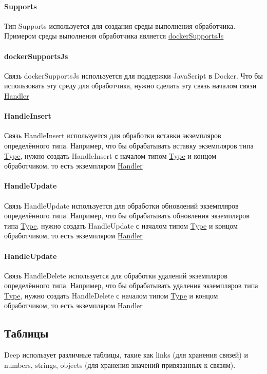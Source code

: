 \documentclass{article}
\begin{document}
\paragraph*{Supports}
Тип Supports\hypertarget{handler.Def}{} используется для создания среды
выполнения обработчика. Примером среды выполнения обработчика является
\hyperlink{dockerSupportsJs.Def}{dockerSupportsJs}
\paragraph*{dockerSupportsJs}
Связь dockerSupportsJs\hypertarget{dockerSupportsJs.Def}{} используется для
поддержки JavaScript в Docker. Что бы использовать эту среду для обработчика,
нужно сделать эту связь началом связи \hyperlink{handler.Def}{Handler}
\paragraph*{HandleInsert}
Связь HandleInsert\hypertarget{HandleInsert.Def}{} используется для обработки
вставки экземпляров определённого типа. Например, что бы обрабатывать вставку
экземпляров типа \hyperlink{type.Def}{Type}, нужно создать HandleInsert с
началом типом \hyperlink{type.Def}{Type} и концом обработчиком, то есть
экземпляром \hyperlink{handler.Def}{Handler}
\paragraph*{HandleUpdate}
Связь HandleUpdate\hypertarget{HandleUpdate.Def}{} используется для обработки
обновлений экземпляров определённого типа. Например, что бы обрабатывать
обновления экземпляров типа \hyperlink{type.Def}{Type}, нужно создать
HandleUpdate с началом типом \hyperlink{type.Def}{Type} и концом обработчиком,
то есть экземпляром \hyperlink{handler.Def}{Handler}
\paragraph*{HandleUpdate}
Связь HandleDelete\hypertarget{HandleDelete.Def}{} используется для обработки
удалений экземпляров определённого типа. Например, что бы обрабатывать удаления
экземпляров типа \hyperlink{type.Def}{Type}, нужно создать HandleDelete с
началом типом \hyperlink{type.Def}{Type} и концом обработчиком, то есть
экземпляром \hyperlink{handler.Def}{Handler}

\subsection{Таблицы}
Deep использует различные таблицы, такие как links (для хранения связей) и
numbers, strings, objects (для хранения значений привязанных к связям).
\end{document}
